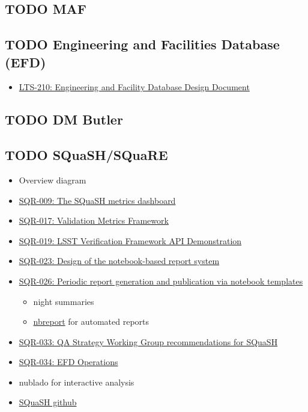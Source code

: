 \subsection{{\bfseries\sffamily TODO} MAF}
\label{sec:org2897a29}
\subsection{{\bfseries\sffamily TODO} Engineering and Facilities Database (EFD)}
\label{sec:orgb8f9467}
\begin{itemize}
\item \href{https://ls.st/LTS-210}{LTS-210: Engineering and Facility Database Design Document}
\end{itemize}
\subsection{{\bfseries\sffamily TODO} DM Butler}
\label{sec:org3233a85}
\subsection{{\bfseries\sffamily TODO} SQuaSH/SQuaRE}
\label{sec:org79afcc3}
\begin{itemize}
\item Overview diagram
\label{sec:orgf7a6227}
\item \href{https://sqr-009.lsst.io/}{SQR-009: The SQuaSH metrics dashboard}
\label{sec:orgc2b5641}
\item \href{https://sqr-017.lsst.io}{SQR-017: Validation Metrics Framework}
\label{sec:org89e367e}
\item \href{https://sqr-019.lsst.io/}{SQR-019: LSST Verification Framework API Demonstration}
\label{sec:org5b8403f}
\item \href{https://sqr-023.lsst.io/}{SQR-023: Design of the notebook-based report system}
\label{sec:org4e954ad}
\item \href{https://sqr-026.lsst.io/}{SQR-026: Periodic report generation and publication via notebook templates}
\label{sec:orga84b076}
\begin{itemize}
\item night summaries
\label{sec:orgd5ea38b}
\item \href{https://nbreport.lsst.io/}{nbreport} for automated reports
\label{sec:orgb9bdb69}
\end{itemize}
\item \href{https://sqr-033.lsst.io/}{SQR-033: QA Strategy Working Group recommendations for SQuaSH}
\label{sec:orgf638a02}
\item \href{https://sqr-034.lsst.io/}{SQR-034: EFD Operations}
\label{sec:org2582b32}
\item nublado for interactive analysis
\label{sec:org351c734}
\item \href{https://github.com/lsst-sqre/squash}{SQuaSH github}
\label{sec:org1e55846}
\end{itemize}
